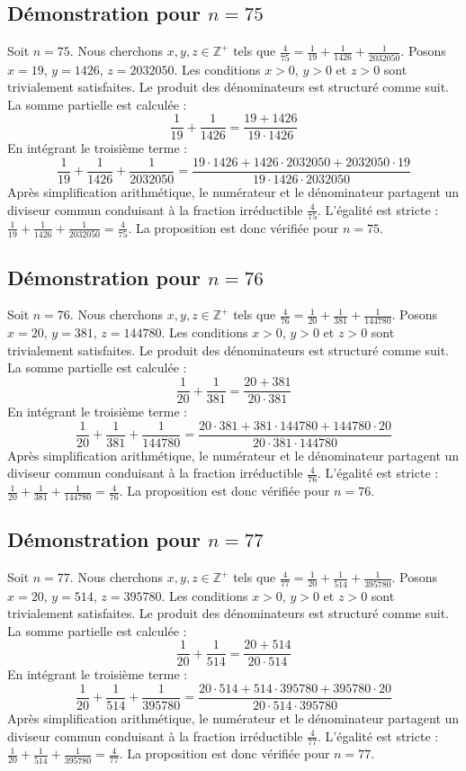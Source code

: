 \documentclass[11pt,a4paper]{article}
\begin{document}
\subsection{Démonstration pour $n = 75$}
Soit $n = 75$. Nous cherchons $x, y, z \in \mathbb{Z}^{+}$ tels que $\frac{4}{75} = \frac{1}{19} + \frac{1}{1426} + \frac{1}{2032050}$.
Posons $x = 19$, $y = 1426$, $z = 2032050$.
Les conditions $x > 0$, $y > 0$ et $z > 0$ sont trivialement satisfaites.
Le produit des dénominateurs est structuré comme suit. La somme partielle est calculée :
$$ \frac{1}{19} + \frac{1}{1426} = \frac{19+1426}{19 \cdot 1426} $$
En intégrant le troisième terme :
$$ \frac{1}{19} + \frac{1}{1426} + \frac{1}{2032050} = \frac{19 \cdot 1426 + 1426 \cdot 2032050 + 2032050 \cdot 19}{19 \cdot 1426 \cdot 2032050} $$
Après simplification arithmétique, le numérateur et le dénominateur partagent un diviseur commun conduisant à la fraction irréductible $\frac{4}{75}$.
L'égalité est stricte : $\frac{1}{19} + \frac{1}{1426} + \frac{1}{2032050} = \frac{4}{75}$.
La proposition est donc vérifiée pour $n = 75$.
\subsection{Démonstration pour $n = 76$}
Soit $n = 76$. Nous cherchons $x, y, z \in \mathbb{Z}^{+}$ tels que $\frac{4}{76} = \frac{1}{20} + \frac{1}{381} + \frac{1}{144780}$.
Posons $x = 20$, $y = 381$, $z = 144780$.
Les conditions $x > 0$, $y > 0$ et $z > 0$ sont trivialement satisfaites.
Le produit des dénominateurs est structuré comme suit. La somme partielle est calculée :
$$ \frac{1}{20} + \frac{1}{381} = \frac{20+381}{20 \cdot 381} $$
En intégrant le troisième terme :
$$ \frac{1}{20} + \frac{1}{381} + \frac{1}{144780} = \frac{20 \cdot 381 + 381 \cdot 144780 + 144780 \cdot 20}{20 \cdot 381 \cdot 144780} $$
Après simplification arithmétique, le numérateur et le dénominateur partagent un diviseur commun conduisant à la fraction irréductible $\frac{4}{76}$.
L'égalité est stricte : $\frac{1}{20} + \frac{1}{381} + \frac{1}{144780} = \frac{4}{76}$.
La proposition est donc vérifiée pour $n = 76$.
\subsection{Démonstration pour $n = 77$}
Soit $n = 77$. Nous cherchons $x, y, z \in \mathbb{Z}^{+}$ tels que $\frac{4}{77} = \frac{1}{20} + \frac{1}{514} + \frac{1}{395780}$.
Posons $x = 20$, $y = 514$, $z = 395780$.
Les conditions $x > 0$, $y > 0$ et $z > 0$ sont trivialement satisfaites.
Le produit des dénominateurs est structuré comme suit. La somme partielle est calculée :
$$ \frac{1}{20} + \frac{1}{514} = \frac{20+514}{20 \cdot 514} $$
En intégrant le troisième terme :
$$ \frac{1}{20} + \frac{1}{514} + \frac{1}{395780} = \frac{20 \cdot 514 + 514 \cdot 395780 + 395780 \cdot 20}{20 \cdot 514 \cdot 395780} $$
Après simplification arithmétique, le numérateur et le dénominateur partagent un diviseur commun conduisant à la fraction irréductible $\frac{4}{77}$.
L'égalité est stricte : $\frac{1}{20} + \frac{1}{514} + \frac{1}{395780} = \frac{4}{77}$.
La proposition est donc vérifiée pour $n = 77$.
\end{document}
